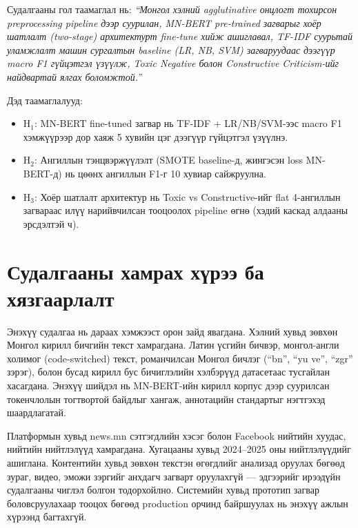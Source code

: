 Судалгааны гол таамаглал нь: \textit{``Монгол хэлний agglutinative онцлогт
тохирсон preprocessing pipeline дээр суурилан, MN-BERT pre-trained загварыг
хоёр шатлалт (two-stage) архитектурт fine-tune хийж ашиглавал, TF-IDF
суурьтай уламжлалт машин сургалтын baseline (LR, NB, SVM) загваруудаас
дээгүүр macro F1 гүйцэтгэл үзүүлж, Toxic Negative болон Constructive
Criticism-ийг найдвартай ялгах боломжтой.''}

Дэд таамаглалууд:
\begin{itemize}
  \item H$_1$: MN-BERT fine-tuned загвар нь TF-IDF + LR/NB/SVM-ээс macro F1
    хэмжүүрээр дор хаяж 5 хувийн цэг дээгүүр гүйцэтгэл үзүүлнэ.
  \item H$_2$: Ангиллын тэнцвэржүүлэлт (SMOTE baseline-д, жингэсэн loss
    MN-BERT-д) нь цөөнх ангиллын F1-г 10 хувиар сайжруулна.
  \item H$_3$: Хоёр шатлалт архитектур нь Toxic vs Constructive-ийг flat
    4-ангиллын загвараас илүү нарийвчилсан тооцоолох pipeline өгнө (хэдий
    каскад алдааны эрсдэлтэй ч).
\end{itemize}

\section{Судалгааны хамрах хүрээ ба хязгаарлалт}

Энэхүү судалгаа нь дараах хэмжээст орон зайд явагдана. Хэлний хувьд зөвхөн
Монгол кирилл бичгийн текст хамрагдана. Латин үсгийн бичвэр, монгол-англи
холимог (code-switched) текст, романчилсан Монгол бичлэг (``bn'', ``yu ve'',
``zgr'' зэрэг), болон бусад кирилл бус бичиглэлийн хэлбэрүүд датасетаас
тусгайлан хасагдана. Энэхүү шийдэл нь MN-BERT-ийн кирилл корпус дээр суурилсан
токенчлолын тогтвортой байдлыг хангаж, аннотацийн стандартыг нэгтгэхэд
шаардлагатай.

Платформын хувьд news.mn сэтгэгдлийн хэсэг болон Facebook нийтийн хуудас,
нийтийн нийтлэлүүд хамрагдана. Хугацааны хувьд 2024--2025 оны нийтлэлүүдийг
ашиглана. Контентийн хувьд зөвхөн текстэн өгөгдлийг анализад оруулах бөгөөд
зураг, видео, эможи зэргийг анхдагч загварт оруулахгүй --- эдгээрийг ирээдүйн
судалгааны чиглэл болгон тодорхойлно. Системийн хувьд прототип загвар
боловсруулахаар тооцох бөгөөд production орчинд байршуулах нь энэхүү ажлын
хүрээнд багтахгүй.

